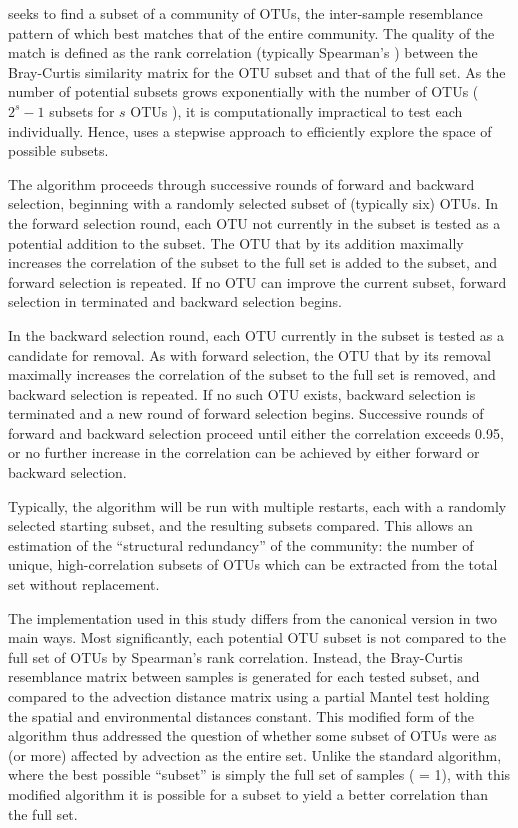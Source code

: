  seeks to find a subset of a community of \acp{OTU}, the inter-sample resemblance pattern of which best matches that of the entire community.
The quality of the match is defined as the rank correlation (typically Spearman's \textrho) between the Bray-Curtis similarity matrix for the \ac{OTU} subset and that of the full set.
As the number of potential subsets grows exponentially with the number of \acp{OTU} ($2^{s}-1$ subsets for $s$ \acp{OTU} \cite{Clarke:1998ki}), it is computationally impractical to test each individually.
Hence,  uses a stepwise approach to efficiently explore the space of possible subsets.

The algorithm proceeds through successive rounds of forward and backward selection, beginning with a randomly selected subset of (typically six) \acp{OTU}.
In the forward selection round, each \ac{OTU} not currently in the subset is tested as a potential addition to the subset.
The \ac{OTU} that by its addition maximally increases the correlation of the subset to the full set is added to the subset, and forward selection is repeated.
If no \ac{OTU} can improve the current subset, forward selection in terminated and backward selection begins.

In the backward selection round, each \ac{OTU} currently in the subset is tested as a candidate for removal.
As with forward selection, the \ac{OTU} that by its removal maximally increases the correlation of the subset to the full set is removed, and backward selection is repeated.
If no such \ac{OTU} exists, backward selection is terminated and a new round of forward selection begins.
Successive rounds of forward and backward selection proceed until either the correlation exceeds 0.95, or no further increase in the correlation can be achieved by either forward or backward selection.

Typically, the algorithm will be run with multiple restarts, each with a randomly selected starting subset, and the resulting subsets compared.
This allows an estimation of the ``structural redundancy'' of the community: the number of unique, high-correlation subsets of \acp{OTU} which can be extracted from the total set without replacement.

The  implementation used in this study differs from the canonical version \cite{Clarke:1998ki} in two main ways.
Most significantly, each potential \ac{OTU} subset is not compared to the full set of \acp{OTU} by Spearman's rank correlation.
Instead, the Bray-Curtis resemblance matrix between samples is generated for each tested subset, and compared to the advection distance matrix using a partial Mantel test holding the spatial and environmental distances constant.
This modified form of the algorithm thus addressed the question of whether some subset of \acp{OTU} were as (or more) affected by advection as the entire set.
Unlike the standard algorithm, where the best possible ``subset'' is simply the full set of samples (\textrho{} = 1), with this modified algorithm it is possible for a subset to yield a better correlation than the full set.

